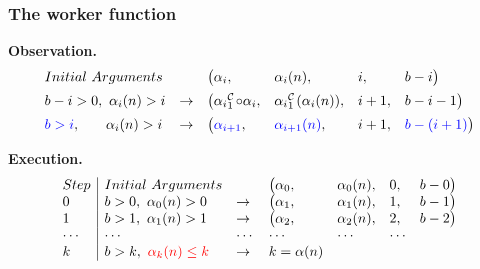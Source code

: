 \begin{frame}
\frametitle{The worker function}

\textbf{Observation.}
\begin{equation*}
\begin{array}{lllllll}
Initial \ Arguments & & \big(\alpha_i, & \alpha_i(n), & i, & b - i \big) \\[5pt]
b - i > 0, \ \alpha_i(n) > i & \to & \big(\cdt{\alpha_i}{1}\circ \alpha_i, & \cdt{\alpha_i}{1}(\alpha_i(n)), & i + 1, & b - i - 1\big) \\[5pt]
{\color{blue} b > i}, \ \hspace{15pt} \alpha_i(n) > i & \to  & \big({\color{blue} \alpha_{i+1}}, & {\color{blue} \alpha_{i+1}(n)}, & i + 1, & {\color{blue} b - (i + 1)}\big) \\
\end{array}
\end{equation*}

\textbf{Execution.}
\begin{equation*}
\begin{array}{l|lllllll}
Step & Initial \ Arguments &  &  \big(\alpha_0, & \alpha_0(n), & 0, & b - 0 \big) \\
0 & b > 0, \ \alpha_0(n) > 0 & \to & \big(\alpha_1, & \alpha_1(n), & 1, & b - 1\big) \\
1 & b > 1, \ \alpha_1(n) > 1 & \to  & \big(\alpha_2, & \alpha_2(n), & 2, & b - 2\big) \\
\cdots & \cdots & \cdots & \cdots & \cdots & \cdots \\
k & b > k, \ {\color{red} \alpha_{k}(n) \le k} & \to  & k = \alpha(n)
\end{array}
\end{equation*}
\end{frame}



